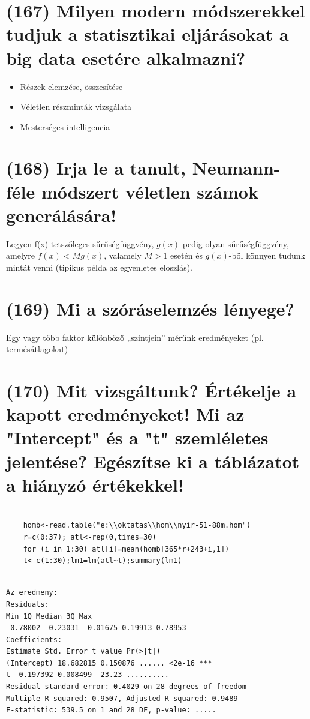 \documentclass[12p]{article}
\begin{document}
\section{(167) Milyen modern módszerekkel tudjuk a statisztikai eljárásokat a big data esetére alkalmazni?}

\begin{itemize}
\item Részek elemzése, összesítése
\item Véletlen részminták vizsgálata
\item Mesterséges intelligencia
\end{itemize}


\section{(168) Irja le a tanult, Neumann-féle módszert véletlen számok generálására!}
Legyen f(x) tetszőleges sűrűségfüggvény, $g(x)$ pedig olyan sűrűségfüggvény, amelyre $f(x) < Mg(x)$, valamely $M>1$ esetén és $g(x)$-ből könnyen tudunk mintát venni (tipikus példa az egyenletes eloszlás).

\section{(169) Mi a szóráselemzés lényege?}
Egy vagy több faktor különböző „szintjein” mérünk eredményeket (pl. termésátlagokat)


\section{(170) Mit vizsgáltunk? Értékelje a kapott eredményeket! Mi az "Intercept" és a "t" szemléletes
jelentése? Egészítse ki a táblázatot a hiányzó értékekkel!}

\begin{verbatim}

	homb<-read.table("e:\\oktatas\\hom\\nyir-51-88m.hom")
	r=c(0:37); atl<-rep(0,times=30)
	for (i in 1:30) atl[i]=mean(homb[365*r+243+i,1])
	t<-c(1:30);lm1=lm(atl~t);summary(lm1)
	
\end{verbatim}
\begin{verbatim}
Az eredmeny:
Residuals:
Min 1Q Median 3Q Max
-0.78002 -0.23031 -0.01675 0.19913 0.78953
Coefficients:
Estimate Std. Error t value Pr(>|t|)
(Intercept) 18.682815 0.150876 ...... <2e-16 ***
t -0.197392 0.008499 -23.23 ..........
Residual standard error: 0.4029 on 28 degrees of freedom
Multiple R-squared: 0.9507, Adjusted R-squared: 0.9489
F-statistic: 539.5 on 1 and 28 DF, p-value: .....
\end{verbatim}
\end{document}
